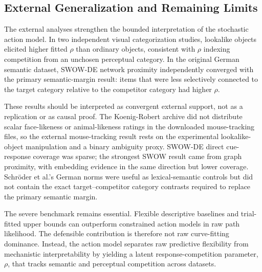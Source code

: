 
\subsection{External Generalization and Remaining Limits}

The external analyses strengthen the bounded interpretation of the stochastic action model. In two independent visual categorization studies, lookalike objects elicited higher fitted $\rho$ than ordinary objects, consistent with $\rho$ indexing competition from an unchosen perceptual category. In the original German semantic dataset, SWOW-DE network proximity independently converged with the primary semantic-margin result: items that were less selectively connected to the target category relative to the competitor category had higher $\rho$.

These results should be interpreted as convergent external support, not as a replication or as causal proof. The Koenig-Robert archive did not distribute scalar face-likeness or animal-likeness ratings in the downloaded mouse-tracking files, so the external mouse-tracking result rests on the experimental lookalike-object manipulation and a binary ambiguity proxy. SWOW-DE direct cue-response coverage was sparse; the strongest SWOW result came from graph proximity, with embedding evidence in the same direction but lower coverage. Schröder et al.'s German norms were useful as lexical-semantic controls but did not contain the exact target--competitor category contrasts required to replace the primary semantic margin.

The severe benchmark remains essential. Flexible descriptive baselines and trial-fitted upper bounds can outperform constrained action models in raw path likelihood. The defensible contribution is therefore not raw curve-fitting dominance. Instead, the action model separates raw predictive flexibility from mechanistic interpretability by yielding a latent response-competition parameter, $\rho$, that tracks semantic and perceptual competition across datasets.
